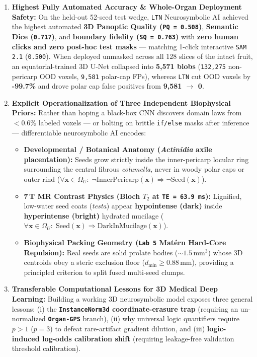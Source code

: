 \documentclass[10pt,a4paper]{article}
\begin{document}
\begin{enumerate}
    \item \textbf{Highest Fully Automated Accuracy \& Whole-Organ Deployment Safety:} On the held-out 52-seed test wedge, \texttt{LTN} Neurosymbolic AI achieved the highest automated \textbf{3D Panoptic Quality (\texttt{PQ = 0.508})}, \textbf{Semantic Dice (\texttt{0.717})}, and \textbf{boundary fidelity (\texttt{SQ = 0.763})} with \textbf{zero human clicks and zero post-hoc test masks} --- matching 1-click interactive \texttt{SAM 2.1} (\texttt{0.500}). When deployed unmasked across all 128 slices of the intact fruit, an equatorial-trained 3D U-Net collapsed into \textbf{5,571 blobs} (\texttt{132,275} non-pericarp OOD voxels, \texttt{9,581} polar-cap FPs), whereas \texttt{LTN} cut OOD voxels by \textbf{-99.7\%} and drove polar cap false positives from \textbf{9,581 $\to$ 0}.
    \item \textbf{Explicit Operationalization of Three Independent Biophysical Priors:} Rather than hoping a black-box CNN discovers domain laws from $<0.6\%$ labeled voxels --- or bolting on brittle \texttt{if/else} masks after inference --- differentiable neurosymbolic AI encodes:
    \begin{itemize}
        \item \textbf{Developmental / Botanical Anatomy (\textit{Actinidia} axile placentation):} Seeds grow strictly inside the inner-pericarp locular ring surrounding the central fibrous \textit{columella}, never in woody polar caps or outer rind ($\forall \mathbf{x} \in \Omega_U:\; \neg\text{InnerPericarp}(\mathbf{x}) \Rightarrow \neg\text{Seed}(\mathbf{x})$).
        \item \textbf{7\,T MR Contrast Physics (Bloch $T_2$ at \texttt{TE = 63.9\,ms}):} Lignified, low-water seed coats (\textit{testa}) appear \textbf{hypointense (dark)} inside \textbf{hyperintense (bright)} hydrated mucilage ($\forall \mathbf{x} \in \Omega_U:\; \text{Seed}(\mathbf{x}) \Rightarrow \text{DarkInMucilage}(\mathbf{x})$).
        \item \textbf{Biophysical Packing Geometry (\texttt{Lab 5} Mat\'ern Hard-Core Repulsion):} Real seeds are solid prolate bodies ($\sim 1.5\,\text{mm}^3$) whose 3D centroids obey a steric exclusion floor ($d_{\min} \ge 0.88\,\text{mm}$), providing a principled criterion to split fused multi-seed clumps.
    \end{itemize}
    \item \textbf{Transferable Computational Lessons for 3D Medical Deep Learning:} Building a working 3D neurosymbolic model exposes three general lessons: (i) the \textbf{\texttt{InstanceNorm3d} coordinate-erasure trap} (requiring an un-normalized \textbf{\texttt{Organ-GPS}} branch), (ii) why universal logic quantifiers require \textbf{$p > 1$} ($p=3$) to defeat rare-artifact gradient dilution, and (iii) \textbf{logic-induced log-odds calibration shift} (requiring leakage-free validation threshold calibration).

\end{enumerate}
\end{document}
